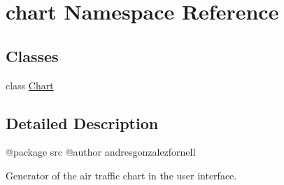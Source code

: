 \hypertarget{namespacechart}{}\section{chart Namespace Reference}
\label{namespacechart}
\subsection*{Classes}
\begin{DoxyCompactItemize}
\item 
class \hyperlink{classchart_1_1_chart}{Chart}
\end{DoxyCompactItemize}


\subsection{Detailed Description}
\begin{DoxyVerb}@package src 
@author andresgonzalezfornell

Generator of the air traffic chart in the user interface.
\end{DoxyVerb}
 